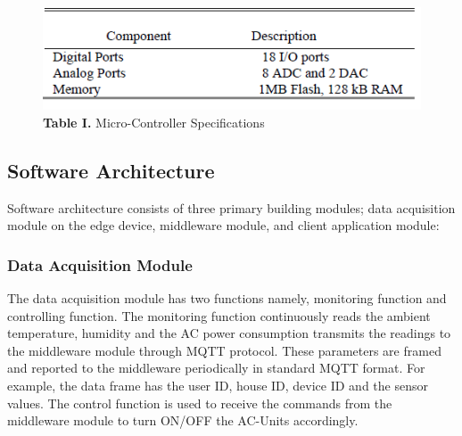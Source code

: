 \documentclass[a4paper,12pt,oneside]{article}
\let\counterwithin\relax
\begin{document}
\begin{figure}[H]
\includegraphics{Table1.png}
\centering
\caption{\textbf{Table I.} Micro-Controller Specifications}
\end{figure}

\subsection{Software Architecture}
Software architecture consists of three primary building
modules; data acquisition module on the edge device,
middleware module, and client application module:
\subsubsection{Data Acquisition Module}
The data acquisition module has two functions namely,
monitoring function and controlling function. The monitoring
function continuously reads the ambient temperature, humidity
and the AC power consumption transmits the readings to the
middleware module through MQTT protocol. These
parameters are framed and reported to the middleware
periodically in standard MQTT format. For example, the data
frame has the user ID, house ID, device ID and the sensor values. The control function is used to receive the commands
from the middleware module to turn ON/OFF the AC-Units
accordingly.
\end{document}
